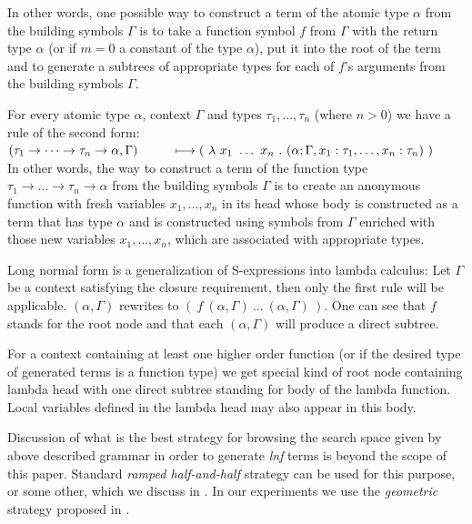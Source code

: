 \documentclass{sig-alternate}
\newcommand{\lnf}{\textit{lnf}\xspace}
\newcommand{\ar}{\rightarrow\xspace}
\newcommand{\gar}{\longmapsto}
\begin{document}
In other words, one possible way to construct a term of 
the atomic type $\alpha$ from the building symbols $\Gamma$
is to take a function symbol $f$ from $\Gamma$ with 
the return type $\alpha$ (or if $m=0$ a constant of the type $\alpha$),
put it into the root of the term and to generate 
a subtrees of appropriate types for each of $f$'s arguments
from the building symbols $\Gamma$.  

For every atomic type $\alpha$, context $\Gamma$ and types
$\tau_1 , \dots , \tau_n$ (where $n > 0$) 
we have a rule of the second form:\\

$
( \tau_1 \ar \dots \ar \tau_n \ar \alpha , \Gamma )  
 \\ ~~~~~~~~\gar
(~\lambda~x_1~\dots~x_n~.~
( \alpha ; \Gamma , x_1:\tau_1 , \dots , x_n:\tau_n  )~)
$~\\

In other words, the way to construct a term of 
the function type $\tau_1 \ar \dots \ar \tau_n \ar \alpha$ 
from the building symbols $\Gamma$
is to create an anonymous function
with fresh variables $x_1, \dots , x_n$ in its head 
whose body is constructed as a term that has type $\alpha$
and is constructed using symbols from $\Gamma$ 
enriched with those new variables $x_1, \dots , x_n$,
which are associated with appropriate types.
  


Long normal form is a generalization of S-expressions into lambda calculus:
Let $\Gamma$ be a context satisfying the closure requirement, then only
the first rule will be applicable. 
$(\alpha, \Gamma)$ rewrites to $(~f~( \alpha, \Gamma )~\dots~( \alpha, \Gamma )~)$.
One can see that $f$ stands for 
the root node and that each $( \alpha , \Gamma )$ will produce a direct subtree. 

For a context containing at least one higher order function 
(or if the desired type of generated terms is a function type) we get special kind of root node containing lambda head with one direct subtree standing for body of the lambda function. Local variables defined in the lambda head may also appear in this body. 


Discussion of what is the best strategy for browsing the search space given by above described grammar in order to generate \lnf terms is beyond the scope of this paper. Standard \textit{ramped half-and-half} strategy can be used for this purpose, or some other, 
which we discuss in \cite{nasecec}. In our experiments we use the \textit{geometric} strategy proposed in 
\cite{nasecec}.
\end{document}
